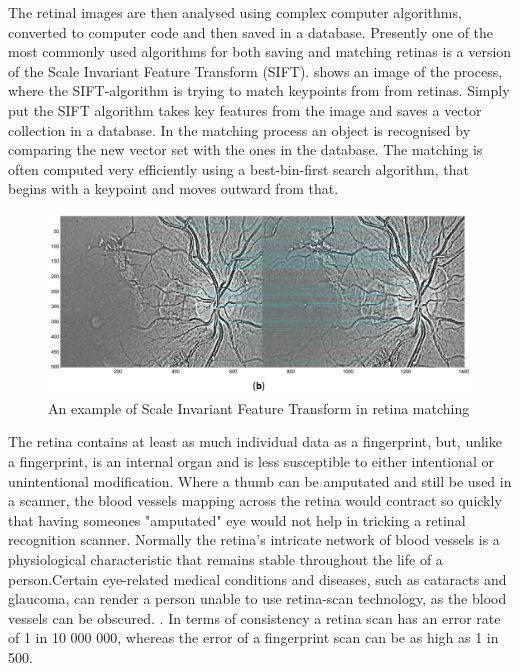 The retinal images are then analysed using complex computer algorithms, converted to
computer code and then saved in a database. Presently one of the most commonly used
algorithms for both saving and matching retinas is a version of the Scale Invariant
Feature Transform (SIFT).  shows an image of the process, where the
SIFT-algorithm is trying to match keypoints from from retinas. Simply put the SIFT
algorithm takes key features from the image and saves a vector collection in a database.
In the matching process an object is recognised by comparing the new vector set with
the ones in the database. The matching is often computed very efficiently using a
best-bin-first search algorithm, that begins with a keypoint and moves outward from that.

\begin{figure}[htbp]
\centering
\includegraphics{figures/sift}
\caption{An example of Scale Invariant Feature Transform in retina matching}
\label{fig:sift}
\end{figure}

The retina contains at least as much individual data as a fingerprint, but, unlike
a fingerprint, is an internal organ and is less susceptible to either intentional
or unintentional modification. Where a thumb can be amputated and still be used in
a scanner, the blood vessels mapping across the retina would contract so quickly
that having someones "amputated" eye would not help in tricking a retinal recognition
scanner. Normally the retina’s intricate network of blood vessels is a physiological
characteristic that remains stable throughout the life of a person.Certain eye-related
medical conditions and diseases, such as cataracts and glaucoma, can render a person
unable to use retina-scan technology, as the blood vessels can be obscured.
\cite{rarr_2015}.  In terms of consistency a retina scan has an error rate of
1 in 10 000 000, whereas the error of a fingerprint scan can be as high as 1 in 500.

